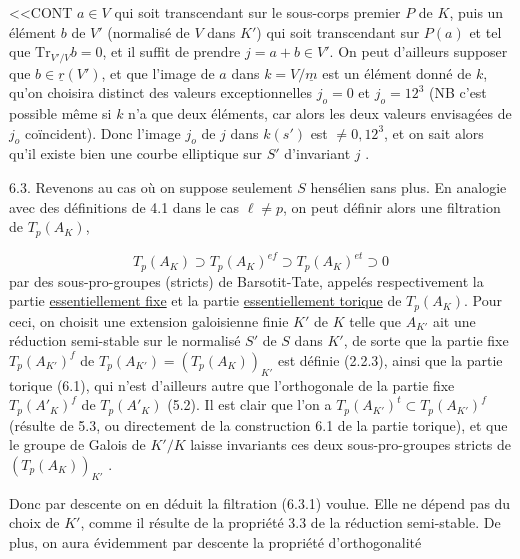 
<<CONT $a \in V$ qui soit transcendant sur le sous-corps premier $P$ de $K$, puis un élément $b$ de $V'$ (normalisé de $V$ dans $K'$) qui soit transcendant sur $P(a)$ et tel que $\mathrm{Tr}_{V'/V} b = 0$, et il suffit de prendre $j = a + b \in V'$. On peut d'ailleurs supposer que $b \in \underline{r}(V')$, et que l'image de $a$ dans $k = V/\underline{m}$ est un élément donné de $k$, qu'on choisira distinct des valeurs exceptionnelles $j_o = 0$ et $j_o = 12^3$ (NB c'est possible même si $k$ n'a que deux éléments, car alors les deux valeurs envisagées de $j_o$ coïncident). Donc l'image $j_o$ de $j$ dans $k(s')$ est $\neq 0,12^3$, et on sait alors qu'il existe bien une courbe elliptique sur $S'$ d'invariant $j$ .

6.3. Revenons au cas où on suppose seulement $S$ hensélien sans plus. En analogie avec des définitions de 4.1 dans le cas $\ell \neq p$, on peut définir alors une filtration de $T_p(A_K)$,

\begin{equation}\tag{6.3.1}
T_p(A_K) \supset T_p(A_K)^{ef} \supset T_p(A_K)^{et} \supset 0
\end{equation}
par des sous-pro-groupes (stricts) de Barsotit-Tate, appelés respectivement la partie \underline{essentiellement fixe} et la partie \underline{essentiellement torique} de $T_p(A_K)$. Pour ceci, on choisit une extension galoisienne finie $K'$ de $K$ telle que $A_{K'}$ ait une réduction semi-stable sur le normalisé $S'$ de $S$ dans $K'$, de sorte que la partie fixe $T_p(A_{K'})^f$ de $T_p(A_{K'})=(T_p(A_K))_{K'}$ est définie (2.2.3), ainsi que la partie torique (6.1), qui n'est d'ailleurs autre que l'orthogonale de la partie fixe $T_p(A'_K)^f$ de $T_p(A'_K)$ (5.2). Il est clair que l'on a $T_p(A_{K'})^t \subset T_p(A_{K'})^f$ (résulte de 5.3, ou directement de la construction 6.1 de la partie torique), et que le groupe de Galois de $K'/K$ laisse invariants ces deux sous-pro-groupes stricts de $(T_p(A_K))_{K'}$ .



Donc par descente on en déduit la filtration (6.3.1) voulue. Elle ne dépend pas du choix de $K'$, comme il résulte de la propriété 3.3 de la réduction semi-stable. De plus, on aura évidemment par descente la propriété d'orthogonalité

